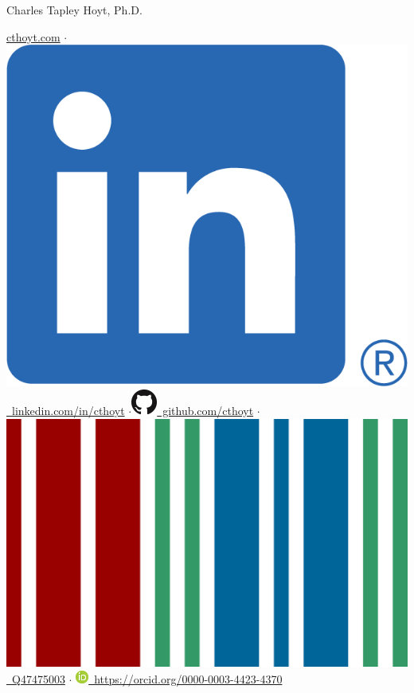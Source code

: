 \documentclass[10pt,a4paper,sans]{moderncv} %
\begin{document}
{\Huge Charles Tapley Hoyt, Ph.D.}

\vspace{3mm}

\href{https://cthoyt.com}{cthoyt.com}
    $\cdot$\href{https://linkedin.com/in/cthoyt}{\includegraphics[scale=0.055]{img/LI-In-Bug}\
    linkedin.com/in/cthoyt}
    $\cdot$\href{https://github.com/cthoyt}{\includegraphics[scale=0.25]{img/GitHub-Mark-32px}\
    github.com/cthoyt}
    $\cdot$\href{https://bioregistry.io/wikidata:Q47475003}{\includegraphics[scale=0.01]{img/wikidata_logo}\ Q47475003}
$\cdot$
\href{https://orcid.org/0000-0003-4423-4370}{\includegraphics[scale=0.5]{img/ORCIDiD_icon16x16}\ https://orcid.org/0000-0003-4423-4370}
\end{document}
